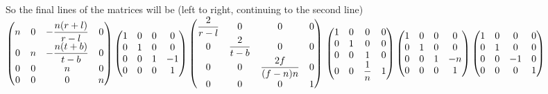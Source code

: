\documentclass[10pt,a4paper]{article}
\begin{document}
So the final lines of the matrices will be (left to right, continuing to the second line) \\

\(
  \begin{pmatrix}
    n & 0 & -\dfrac{n(r+l)}{r-l} & 0 \\
    0 & n & -\dfrac{n(t+b)}{t-b} & 0\\
    0 & 0 & n & 0 \\
    0 & 0 & 0 & n
  \end{pmatrix}
  \begin{pmatrix}
    1 & 0 & 0 & 0 \\
    0 & 1 & 0 & 0\\
    0 & 0 & 1 & -1 \\
    0 & 0 & 0 & 1
  \end{pmatrix}
  \begin{pmatrix}
     \dfrac{2}{r-l} & 0 & 0 & 0 \\
    0 & \dfrac{2}{t-b} & 0 & 0\\
    0 & 0 & \dfrac{2f}{(f-n)n} & 0 \\
    0 & 0 & 0 & 1
  \end{pmatrix} \\ \\ \\
  \begin{pmatrix}
    1 & 0 & 0 & 0 \\
    0 & 1 & 0 & 0\\
    0 & 0 & 1 & 0 \\
    0 & 0 & \dfrac{1}{n} & 1
  \end{pmatrix}
  \begin{pmatrix}
    1 & 0 & 0 & 0 \\
    0 & 1 & 0 & 0\\
    0 & 0 & 1 & -n \\
    0 & 0 & 0 & 1
  \end{pmatrix}
  \begin{pmatrix}
    1 & 0 & 0 & 0 \\
    0 & 1 & 0 & 0\\
    0 & 0 & -1 & 0 \\
    0 & 0 & 0 & 1
  \end{pmatrix}
\) \\ \\
\end{document}

